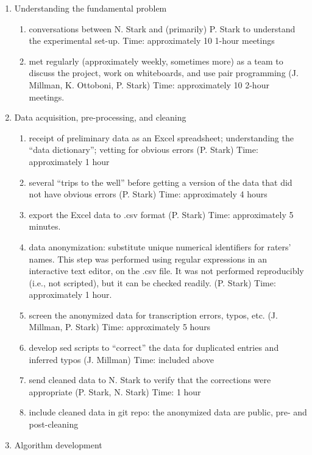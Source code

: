 \documentclass[]{article}
\begin{document}
\begin{enumerate}
\def\labelenumi{\arabic{enumi}.}
\itemsep1pt\parskip0pt
\item
  Understanding the fundamental problem

  \begin{enumerate}
  \def\labelenumii{\roman{enumii}.}
  \itemsep1pt\parskip0pt
  \item
    conversations between N. Stark and (primarily) P. Stark to
    understand the experimental set-up. Time: approximately 10 1-hour
    meetings
  \item
    met regularly (approximately weekly, sometimes more) as a team to
    discuss the project, work on whiteboards, and use pair programming
    (J. Millman, K. Ottoboni, P. Stark) Time: approximately 10 2-hour
    meetings.
  \end{enumerate}
\item
  Data acquisition, pre-processing, and cleaning

  \begin{enumerate}
  \def\labelenumii{\roman{enumii}.}
  \itemsep1pt\parskip0pt
  \item
    receipt of preliminary data as an Excel spreadsheet; understanding
    the ``data dictionary''; vetting for obvious errors (P. Stark) Time:
    approximately 1 hour
  \item
    several ``trips to the well'' before getting a version of the data
    that did not have obvious errors (P. Stark) Time: approximately 4
    hours
  \item
    export the Excel data to .csv format (P. Stark) Time: approximately
    5 minutes.
  \item
    data anonymization: substitute unique numerical identifiers for
    raters' names. This step was performed using regular expressions in
    an interactive text editor, on the .csv file. It was not performed
    reproducibly (i.e., not scripted), but it can be checked readily.
    (P. Stark) Time: approximately 1 hour.
  \item
    screen the anonymized data for transcription errors, typos, etc. (J.
    Millman, P. Stark) Time: approximately 5 hours
  \item
    develop sed scripts to ``correct'' the data for duplicated entries
    and inferred typos (J. Millman) Time: included above
  \item
    send cleaned data to N. Stark to verify that the corrections were
    appropriate (P. Stark, N. Stark) Time: 1 hour
  \item
    include cleaned data in git repo: the anonymized data are public,
    pre- and post-cleaning
  \end{enumerate}
\item
  Algorithm development


\end{enumerate}
\end{document}

